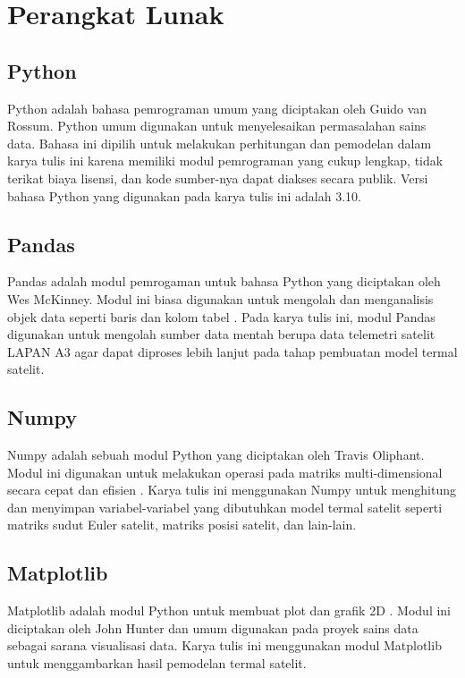 \section{Perangkat Lunak}

\subsection{Python}

Python adalah bahasa pemrograman umum yang diciptakan oleh Guido van
Rossum. Python umum digunakan untuk menyelesaikan permasalahan sains
data. Bahasa ini dipilih untuk melakukan perhitungan dan
pemodelan dalam karya tulis ini karena memiliki modul pemrograman yang
cukup lengkap, tidak terikat biaya lisensi, dan kode sumber-nya dapat
diakses secara publik. Versi bahasa Python yang digunakan pada karya
tulis ini adalah 3.10.

\subsection{Pandas}

Pandas adalah modul pemrogaman untuk bahasa Python yang diciptakan oleh Wes
McKinney. Modul ini biasa digunakan untuk mengolah dan menganalisis objek data
seperti baris dan kolom tabel \cite{reback2022}. Pada karya tulis ini, modul Pandas
digunakan untuk mengolah sumber data mentah berupa data telemetri satelit LAPAN
A3 agar dapat diproses lebih lanjut pada tahap pembuatan model termal satelit.

\subsection{Numpy}

Numpy adalah sebuah modul Python yang diciptakan oleh Travis Oliphant. Modul
ini digunakan untuk melakukan operasi pada matriks multi-dimensional secara
cepat dan efisien \cite{harris2020}. Karya tulis ini menggunakan Numpy untuk
menghitung dan menyimpan variabel-variabel yang dibutuhkan model termal satelit
seperti matriks sudut Euler satelit, matriks posisi satelit, dan lain-lain. 

\subsection{Matplotlib}

Matplotlib adalah modul Python untuk membuat plot dan grafik 2D \cite{hunter2007}.
Modul ini diciptakan oleh John Hunter dan umum digunakan pada proyek sains data
sebagai sarana visualisasi data. Karya tulis ini menggunakan modul Matplotlib
untuk menggambarkan hasil pemodelan termal satelit.

